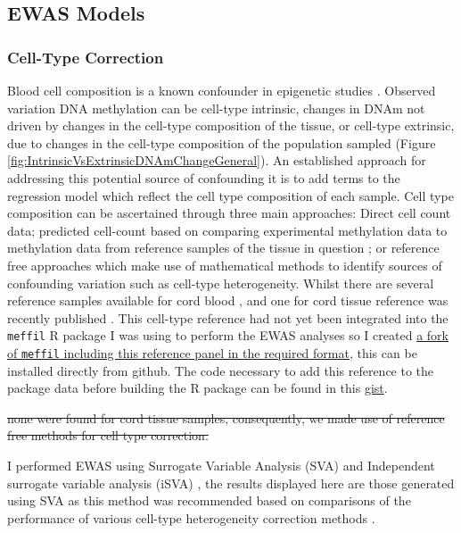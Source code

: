 \documentclass[
]{book}
\begin{document}
\hypertarget{ewas-models}{%
\subsection{EWAS Models}\label{ewas-models}}

\hypertarget{cell-type-correction}{%
\subsubsection{Cell-Type Correction}\label{cell-type-correction}}

Blood cell composition is a known confounder in epigenetic studies \citep{Jaffe2014, Houseman2012}.
Observed variation DNA methylation can be cell-type intrinsic, changes in DNAm not driven by changes in the cell-type composition of the tissue, or cell-type extrinsic, due to changes in the cell-type composition of the population sampled (Figure \ref{fig:IntrinsicVsExtrinsicDNAmChangeGeneral}).
An established approach for addressing this potential source of confounding it is to add terms to the regression model which reflect the cell type composition of each sample.
Cell type composition can be ascertained through three main approaches: Direct cell count data; predicted cell-count based on comparing experimental methylation data to methylation data from reference samples of the tissue in question \citep{Houseman2012}; or reference free approaches which make use of mathematical methods to identify sources of confounding variation such as cell-type heterogeneity.
Whilst there are several reference samples available for cord blood \citep{Cardenas2016, DeGoede2015, Bakulski2016, Gervin2016}, and one for cord tissue reference was recently published \citep{Lin2018}.
This cell-type reference had not yet been integrated into the \texttt{meffil} R package I was using to perform the EWAS analyses so I created \href{https://github.com/RichardJActon/meffil/blob/LinAndKarnaniCordTissueRef/data-raw/lin-karnani-reference.r}{a fork of \texttt{meffil} including this reference panel in the required format}, this can be installed directly from github.
The code necessary to add this reference to the package data before building the R package can be found in this \href{https://gist.github.com/RichardJActon/703ae70438e865a37998cd608bd12cd3}{gist}.

\sout{none were found for cord tissue samples, consequently, we made use of reference free methods for cell type correction.}

I performed EWAS using Surrogate Variable Analysis (SVA) \citep{Leek2007} and Independent surrogate variable analysis (iSVA) \citep{Teschendorff2011}, the results displayed here are those generated using SVA as this method was recommended based on comparisons of the performance of various cell-type heterogeneity correction methods \citep{McGregor2016, Teschendorff2017}.
\end{document}
